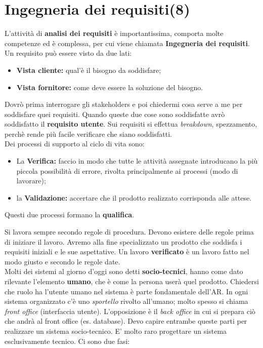 


\section{Ingegneria dei requisiti(8)}

L'attività di \textbf{analisi dei requisiti} è importantissima, comporta molte competenze ed è complessa, per cui viene chiamata \textbf{Ingegneria dei requisiti}. Un requisito può essere visto da due lati:

\begin{itemize}

	\item \textbf{Vista cliente:} qual'è il bisogno da soddisfare;
	\item \textbf{Vista fornitore:} come deve essere la soluzione del bisogno.

\end{itemize}

Dovrò prima interrogare gli stakeholders e poi chiedermi cosa serve a me per soddisfare quei requisiti. Quando queste due cose sono soddisfatte avrò soddisfatto il \textbf{requisito utente}. Sui requisiti si effettua \textit{breakdown}, spezzamento, perchè rende più facile verificare che siano soddisfatti.\\

Dei processi di supporto al ciclo di vita sono:
\begin{itemize}

	\item La \textbf{Verifica:} faccio in modo che tutte le attività assegnate introducano la più piccola possibilità di errore, rivolta principalmente ai processi (modo di lavorare);
	\item la \textbf{Validazione:} accertare che il prodotto realizzato corrisponda alle attese.

\end{itemize}

Questi due processi formano la \textbf{qualifica}.

Si lavora sempre secondo regole di procedura. Devono esistere delle regole prima di iniziare il lavoro. Avremo alla fine specializzato un prodotto che soddisfa i requisiti iniziali e le sue aspettative. Un lavoro \textbf{verificato} è un lavoro fatto nel modo giusto e secondo le regole date. \\
Molti dei sistemi al giorno d'oggi sono detti \textbf{socio-tecnici}, hanno come dato rilevante l'elemento \textbf{umano}, che è come la persona userà quel prodotto. Chiedersi che ruolo ha l'utente umano nel sistema è parte fondamentale dell'AR. In ogni sistema organizzato c'è uno \textit{sportello} rivolto all'umano; molto spesso si chiama \textit{front office} (interfaccia utente). L'opposizione è il \textit{back office} in cui si prepara ciò che andrà al front office (es. database). Devo capire entrambe queste parti per realizzare un sistema socio-tecnico. E' molto raro progettare un sistema esclusivamente tecnico. Ci sono due fasi:

